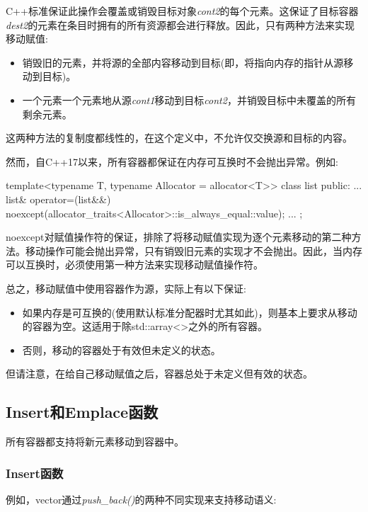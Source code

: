 C++标准保证此操作会覆盖或销毁目标对象\textit{cont2}的每个元素。这保证了目标容器\textit{dest2}的元素在条目时拥有的所有资源都会进行释放。因此，只有两种方法来实现移动赋值:

\begin{itemize}
	\item 销毁旧的元素，并将源的全部内容移动到目标(即，将指向内存的指针从源移动到目标)。
	\item 一个元素一个元素地从源\textit{cont1}移动到目标\textit{cont2}，并销毁目标中未覆盖的所有剩余元素。
\end{itemize}

这两种方法的复制度都线性的，在这个定义中，不允许仅交换源和目标的内容。

然而，自C++17以来，所有容器都保证在内存可互换时不会抛出异常。例如:

\begin{cppcode}
template<typename T, typename Allocator = allocator<T>>
class list {
public:
	...
	list& operator=(list&&)
	noexcept(allocator_traits<Allocator>::is_always_equal::value);
	...
};
\end{cppcode}

noexcept对赋值操作符的保证，排除了将移动赋值实现为逐个元素移动的第二种方法。移动操作可能会抛出异常，只有销毁旧元素的实现才不会抛出。因此，当内存可以互换时，必须使用第一种方法来实现移动赋值操作符。

总之，移动赋值中使用容器作为源，实际上有以下保证:

\begin{itemize}
	\item 如果内存是可互换的(使用默认标准分配器时尤其如此)，则基本上要求从移动的容器为空。这适用于除std::array<>之外的所有容器。
	\item 否则，移动的容器处于有效但未定义的状态。
\end{itemize}

但请注意，在给自己移动赋值之后，容器总处于未定义但有效的状态。

\subsection{Insert和Emplace函数}

所有容器都支持将新元素移动到容器中。

\subsubsection{Insert函数}

例如，vector通过\textit{push_back()}的两种不同实现来支持移动语义:

